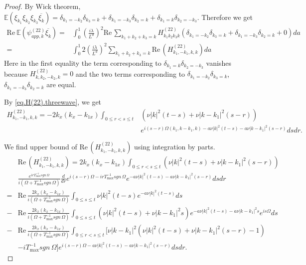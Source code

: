\begin{proof}
By Wick theorem, $\mathbb E\left(\xi_{k_1} \xi_{k_2}\xi_{k_3}\overline{\xi_k}\right)=\delta_{k_1=-k_2}\delta_{k_3=k}+\delta_{k_1=-k_3}\delta_{k_2=k}+\delta_{k_1=k}\delta_{k_2=-k_3}$. Therefore we get 
\begin{equation}\label{eq.H(22)wick.threewave}
\begin{split}
    \text{Re}\  \mathbb E \left(\psi^{(22)}_{app,k}\overline{\xi_k}\right)=&\int^1_{0}\left(\frac{i\lambda}{L^{d}}\right)^2 \text{Re}\,\sum\limits_{k_1+k_2+k_3=k} H^{(22)}_{k_1k_2k_3k}(\delta_{k_1=-k_2}\delta_{k_3=k}+\delta_{k_1=-k_3}\delta_{k_2=k}+0) da
    \\
    =&\int^1_{0}2\left(\frac{i\lambda}{L^{d}}\right)^2 \sum\limits_{k_1+k_2+k_3=k} \text{Re}\,\left(H^{(22)}_{k_1,-k_1,k,k}\right) da
\end{split}
\end{equation}
Here in the first equality the term corresponding to $\delta_{k_1=k}\delta_{k_2=-k_3}$ vanishes because $H^{(22)}_{k,k_2,-k_2,k}=0$ and the two terms corresponding to $\delta_{k_1=-k_2}\delta_{k_3=k}$, $\delta_{k_1=-k_3}\delta_{k_2=k}$ are equal.

By \eqref{eq.H(22).threewave}, we get
\begin{equation}
\begin{split}
    H^{(22)}_{k_1,-k_1,k,k}=-2k_{x}(k_{x}-k_{1x})\int_{0\le r<s\le t}&(\nu|k|^2(t-s)+\nu|k-k_1|^2(s-r))
    \\
    & e^{i (s-r)\Omega(k_1,k-k_1,k)- a\nu|k|^2(t-s)-a\nu|k-k_1|^2(s-r)}  dsdr.
\end{split}
\end{equation}

We find upper bound of $\text{Re}\,\left(H^{(22)}_{k_1,-k_1,k,k}\right)$ using integration by parts.
\begin{equation}\label{eq.ReH(22)bound.threewave}
\begin{split}
    &\text{Re}\,\left(H^{(22)}_{k_1,-k_1,k,k}\right)=2k_{x}(k_{x}-k_{1x})\int_{0\le r<s\le t}(\nu|k|^2(t-s)+\nu|k-k_1|^2(s-r))
    \\
    & \frac{e^{irT^{-1}_{\text{max}}sgn\, \Omega}}{i(\Omega+T^{-1}_{\text{max}}sgn\, \Omega)}\frac{d}{dr}e^{i (s-r)\Omega-irT^{-1}_{\text{max}}sgn\, \Omega}e^{- a\nu|k|^2(t-s)-a\nu|k-k_1|^2(s-r)}  dsdr
    \\
    =&\text{Re}\,\frac{2k_{x}(k_{x}-k_{1x})}{i(\Omega+T^{-1}_{\text{max}}sgn\, \Omega)}\int_{0\le s\le t}\nu|k|^2(t-s) e^{- a\nu|k|^2(t-s)}  ds
    \\
    -&\text{Re}\,\frac{2k_{x}(k_{x}-k_{1x})}{i(\Omega+T^{-1}_{\text{max}}sgn\, \Omega)}\int_{0\le s\le t}(\nu|k|^2(t-s)+\nu|k-k_1|^2s) e^{- a\nu|k|^2(t-s)-a\nu|k-k_1|^2s} e^{is\Omega} ds
    \\
    -&\text{Re}\,\frac{2k_{x}(k_{x}-k_{1x})}{i(\Omega+T^{-1}_{\text{max}}sgn\, \Omega)}\int_{0\le r<s\le t}\big[\nu|k-k_1|^2(\nu|k|^2(t-s)+\nu|k-k_1|^2(s-r)-1)
    \\
    & -iT^{-1}_{\text{max}}sgn\, \Omega\big]e^{i (s-r)\Omega- a\nu|k|^2(t-s)-a\nu|k-k_1|^2(s-r)}  dsdr.
\end{split}
\end{equation}


\end{proof}
